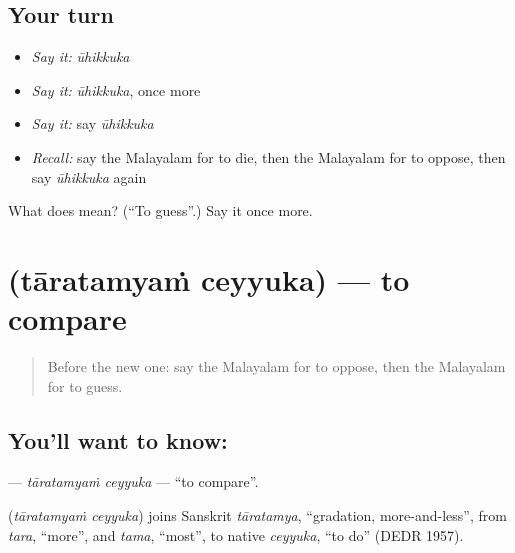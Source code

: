 \subsection*{Your turn}
\begin{itemize}
\raggedright
  \item \emph{Say it:} \emph{ūhikkuka}
  \item \emph{Say it:} \emph{ūhikkuka}, once more
  \item \emph{Say it:} say \emph{ūhikkuka}
  \item \emph{Recall:} say the Malayalam for to die, then the Malayalam for to oppose, then say \emph{ūhikkuka} again
\end{itemize}

\begin{tcolorbox}[breakable,colback=teal!4,colframe=teal!35!black,title={Before you move on}]
What does  mean? (\textquotedblleft{}To guess\textquotedblright{}.) Say it once more.
\end{tcolorbox}
\section[\texorpdfstring{\ml{താരതമ്യം} \ml{ചെയ്യുക} (tāratamyaṁ ceyyuka)}{താരതമ്യം ചെയ്യുക (tāratamyaṁ ceyyuka)}]{  (tāratamyaṁ ceyyuka) — to compare}

\label{lesson:ML-C270-taratamyam-ceyyuka}



\begin{quote}
Before the new one: say the Malayalam for to oppose, then the Malayalam for to guess.
\end{quote}

\subsection*{You'll want to know:  }
\textbf{ } — \emph{tāratamyaṁ ceyyuka} — \textquotedblleft{}to compare\textquotedblright{}.

\begin{cousinweb}
\textbf{ } (\emph{tāratamyaṁ ceyyuka}) joins Sanskrit \emph{tāratamya}, \textquotedblleft{}gradation, more-and-less\textquotedblright{}, from \emph{tara}, \textquotedblleft{}more\textquotedblright{}, and \emph{tama}, \textquotedblleft{}most\textquotedblright{}, to native \emph{ceyyuka}, \textquotedblleft{}to do\textquotedblright{} (DEDR 1957).
\end{cousinweb}

